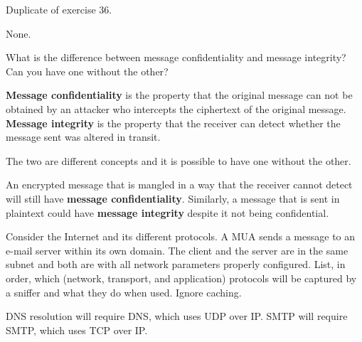 \begin{Exercise}
Duplicate of exercise 36.
\end{Exercise}
\begin{Answer}
None.
\end{Answer}

\begin{Exercise}
What is the difference between message confidentiality and message integrity? Can you have one without the other?
\end{Exercise}
\begin{Answer}
\textbf{Message confidentiality} is the property that the original message can not be obtained by an attacker who intercepts the ciphertext of the original message.
\textbf{Message integrity} is the property that the receiver can detect whether the message sent was altered in transit.

The two are different concepts and it is possible to have one without the other.

An encrypted message that is mangled in a way that the receiver cannot detect will still have \textbf{message confidentiality}.
Similarly, a message that is sent in plaintext could have \textbf{message integrity} despite it not being confidential.
\end{Answer}

\begin{Exercise}
Consider the Internet and its different protocols. A MUA sends a message to an e-mail server within its own domain. The client and the server are in the same subnet and both are with all network parameters properly configured. List, in order, which (network, transport, and application) protocols will be captured by a sniffer and what they do when used. Ignore caching.
\end{Exercise}
\begin{Answer}
DNS resolution will require DNS, which uses UDP over IP.
SMTP will require SMTP, which uses TCP over IP.
\end{Answer}

